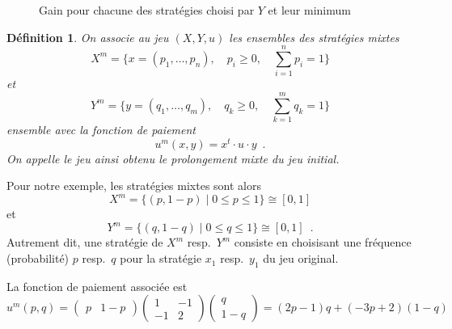\documentclass[11pt]{scrartcl}
\theoremstyle{mydefinition}
\newtheorem{definition}{D\'efinition}
\theoremstyle{myplain}
\begin{document}

\begin{figure}[htb]
 \centering
  \shorthandoff{:}
 \shorthandon{:}
\caption{Gain pour chacune des strat\'egies choisi par $Y$ et leur minimum}
\end{figure}
\begin{definition}
 On associe au jeu $(X,Y,u)$ les ensembles des \emph{strat\'egies mixtes}
  \[ X^m = \{ x = (p_1,\ldots,p_n), \quad p_i \geq 0, \quad \sum_{i=1}^n p_i = 1 \} \]
  et
  \[ Y^m = \{ y = (q_1,\ldots,q_m), \quad q_k \geq 0, \quad \sum_{k=1}^m q_k = 1 \} \]
  ensemble avec la fonction de paiement
  \[ u^m(x,y) = x^t \cdot u \cdot y \enspace . \]
On appelle le jeu ainsi obtenu le \emph{prolongement mixte} du jeu initial.
\end{definition}

Pour notre exemple, les strat\'egies mixtes sont alors
 \[ X^m = \{ (p,1-p) \mid 0 \leq p \leq 1 \} \cong [0,1] \]
et 
 \[ Y^m = \{ (q, 1-q) \mid 0 \leq q \leq 1 \} \cong [0,1] \enspace . \]
Autrement dit, une strat\'egie de $X^m$ resp.\ $Y^m$ consiste 
 en choisisant une fr\'equence (probabilit\'e) $p$ resp.\ $q$ pour la strat\'egie $x_1$ resp.\ $y_1$ du jeu original.
 
La fonction de paiement associ\'ee est
 \[ 
     u^m (p,q) = 
\begin{pmatrix}
     p & 1-p
    \end{pmatrix}
  \begin{pmatrix}
   1 & -1 \\
   -1& 2
  \end{pmatrix}
  \begin{pmatrix}
   q \\
   1-q
  \end{pmatrix} = (2p-1)q + (-3p+2)(1-q) 
\]
\end{document}
